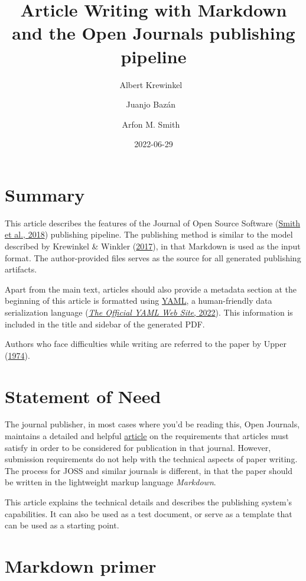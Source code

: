 \documentclass[
]{article}
\title{Article Writing with Markdown and the Open Journals publishing
pipeline}
\author[1,2,4%
  \ensuremath\mathparagraph]{Albert Krewinkel%
    \,\orcidlink{0000-0002-9455-0796}\,%
    }
\author[1%
  *%
  ]{Juanjo Bazán%
    \,\orcidlink{0000-0001-7699-3983}\,%
    }
\author[1,3%
  *%
  ]{Arfon M. Smith%
    \,\orcidlink{0000-0002-3957-2474}\,%
    }
\affil[1]{Open Journals}
\affil[2]{Pandoc Development Team}
\affil[3]{GitHub}
\affil[4]{Technische Universitaet Hamburg%
    \,\protect\href{https://ror.org/04bs1pb34}{\protect\rorlogo}\,%
  }
\affil[$\mathparagraph$]{Corresponding author: %
  albert@zeitkraut.de %
}
\affil[*]{These authors contributed equally.}
\date{2022-06-29}
\begin{document}
\maketitle

\hypertarget{summary}{%
\section{Summary}\label{summary}}

This article describes the features of the Journal of Open Source
Software (\protect\hyperlink{ref-smith2018}{Smith et al., 2018})
publishing pipeline. The publishing method is similar to the model
described by Krewinkel \& Winkler
(\protect\hyperlink{ref-krewinkel2017}{2017}), in that Markdown is used
as the input format. The author-provided files serves as the source for
all generated publishing artifacts.

Apart from the main text, articles should also provide a metadata
section at the beginning of this article is formatted using
\href{https://yaml.org}{YAML}, a human-friendly data serialization
language (\protect\hyperlink{ref-yaml_website}{\emph{The {Official YAML
Web Site}}, 2022}). This information is included in the title and
sidebar of the generated PDF.

Authors who face difficulties while writing are referred to the paper by
Upper (\protect\hyperlink{ref-upper1974}{1974}).

\hypertarget{statement-of-need}{%
\section{Statement of Need}\label{statement-of-need}}

The journal publisher, in most cases where you'd be reading this, Open
Journals, maintains a detailed and helpful
\href{https://joss.readthedocs.io/en/latest/submitting.html}{article} on
the requirements that articles must satisfy in order to be considered
for publication in that journal. However, submission requirements do not
help with the technical aspects of paper writing. The process for JOSS
and similar journals is different, in that the paper should be written
in the lightweight markup language \emph{Markdown}.

This article explains the technical details and describes the publishing
system's capabilities. It can also be used as a test document, or serve
as a template that can be used as a starting point.

\hypertarget{markdown-primer}{%
\section{Markdown primer}\label{markdown-primer}}
\end{document}
